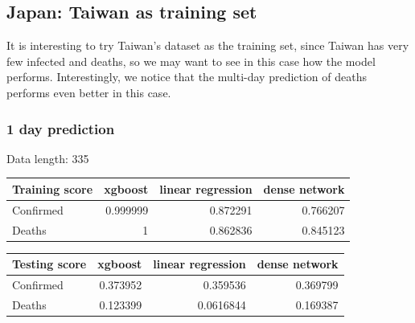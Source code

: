 \documentclass[a4paper,12pt]{article}
\begin{document}
\subsection{Japan: Taiwan as training set}
It is interesting to try Taiwan's dataset as the training set, since Taiwan has very few infected and deaths, so we may want to see in this case how the model performs. Interestingly, we notice that the multi-day prediction of deaths performs even better in this case.
\subsubsection{1 day prediction}
\begin{tcolorbox}
    Data length:	 335

    \begin{tabular}{lrrr}
    \toprule
    Training score   &   xgboost &   linear regression &   dense network \\
    \midrule
    Confirmed        &  0.999999 &            0.872291 &        0.766207 \\
    Deaths           &  1        &            0.862836 &        0.845123 \\
    \bottomrule
    \end{tabular}


    \begin{tabular}{lrrr}
    \toprule
    Testing score   &   xgboost &   linear regression &   dense network \\
    \midrule
    Confirmed       &  0.373952 &           0.359536  &        0.369799 \\
    Deaths          &  0.123399 &           0.0616844 &        0.169387 \\
    \bottomrule
    \end{tabular}

\end{tcolorbox}
\end{document}
